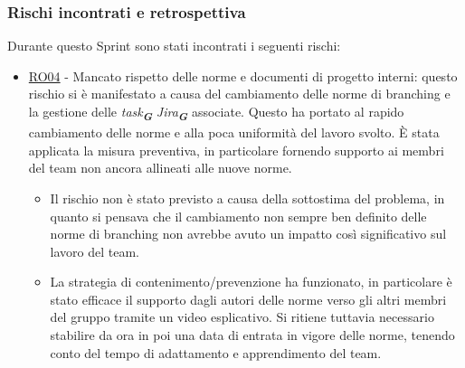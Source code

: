 \documentclass[a4paper,12pt]{article}
\newcommand{\glossario}[1]{\textit{#1}\textsubscript{\textbf{\textit{\textcolor{lightblack}{G}}}}}
\begin{document}
\subsubsection{Rischi incontrati e retrospettiva}
Durante questo Sprint sono stati incontrati i seguenti rischi:
\begin{itemize}
    \item \hyperref[RO04]{RO04} - Mancato rispetto delle norme e documenti di progetto interni: questo rischio si è manifestato a causa del cambiamento delle norme di branching e la gestione delle \glossario{task} \glossario{Jira} associate. Questo ha portato al rapido cambiamento delle norme e alla poca uniformità del lavoro svolto. È stata applicata la misura preventiva, in particolare fornendo supporto ai membri del team non ancora allineati alle nuove norme.
    \begin{itemize}
        \item Il rischio non è stato previsto a causa della sottostima del problema, in quanto si pensava che il cambiamento non sempre ben definito delle norme di branching non avrebbe avuto un impatto così significativo sul lavoro del team.
        \item La strategia di contenimento/prevenzione ha funzionato, in particolare è stato efficace il supporto dagli autori delle norme verso gli altri membri del gruppo tramite un video esplicativo. Si ritiene tuttavia necessario stabilire da ora in poi una data di entrata in vigore delle norme, tenendo conto del tempo di adattamento e apprendimento del team.
    \end{itemize}
\end{itemize}
\end{document}
